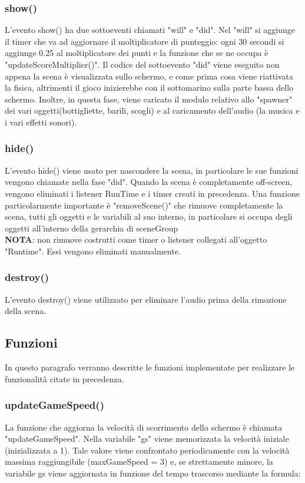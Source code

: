 \documentclass[12pt]{article}
\begin{document}
\subsubsection{show()}
L'evento show() ha due sottoeventi chiamati "will" e "did". Nel "will" si aggiunge il timer che va ad aggiornare il moltiplicatore di punteggio: ogni 30 secondi si aggiunge 0.25 al moltiplicatore dei punti e la funzione che se ne occupa è "updateScoreMultiplier()". Il codice del sottoevento "did" viene eseguito non appena la scena è visualizzata sullo schermo, e come prima cosa viene riattivata la fisica, altrimenti il gioco inizierebbe con il sottomarino sulla parte bassa dello schermo. Inoltre, in questa fase, viene caricato il modulo relativo allo "spawner" dei vari oggetti(bottigliette, barili, scogli) e al caricamento dell'audio (la musica e i vari effetti sonori).

\subsubsection{hide()}
L'evento hide() viene usato per nascondere la scena, in particolare le sue funzioni vengono chiamate nella fase "did". Quando la scena è completamente off-screen, vengono eliminati i listener RunTime e i timer creati in precedenza. Una funzione particolarmente importante è "removeScene()" che rimuove completamente la scena, tutti gli oggetti e le variabili al suo interno,
in particolare si occupa degli oggetti all'interno della gerarchia di sceneGroup 
\\

\textbf{NOTA}: non rimuove costrutti come timer o listener collegati all'oggetto "Runtime". Essi vengono eliminati manualmente.

\subsubsection{destroy()}
L'evento destroy() viene utilizzato per eliminare l'audio prima della rimozione della scena.

\subsection{Funzioni}
In questo paragrafo verranno descritte le funzioni implementate per realizzare le funzionalità citate in precedenza.
\subsubsection{updateGameSpeed()}
La funzione che aggiorna la velocità di scorrimento dello schermo è chiamata "updateGameSpeed". Nella variabile "gs" viene memorizzata la velocità iniziale (inizializzata a 1). Tale valore viene confrontato periodicamente con la velocità massima raggiungibile (maxGameSpeed = 3) e, se strettamente minore, la variabile gs viene aggiornata in funzione del tempo trascorso mediante la formula:\\
\end{document}
